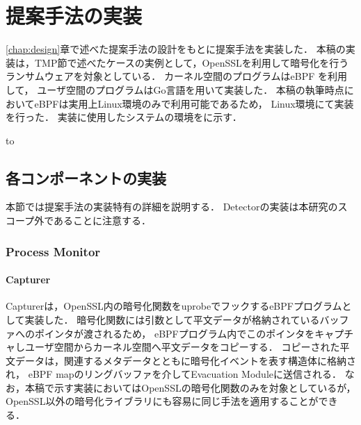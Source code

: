 \chapter{提案手法の実装}
\ref{chap:design}章で述べた提案手法の設計をもとに提案手法を実装した．
本稿の実装は，TMP節で述べたケースの実例として，OpenSSLを利用して暗号化を行うランサムウェアを対象としている．
カーネル空間のプログラムはeBPF \cite{WhatiseB81:online} を利用して，
ユーザ空間のプログラムはGo言語を用いて実装した．
本稿の執筆時点においてeBPFは実用上Linux環境のみで利用可能であるため，
Linux環境にて実装を行った．
実装に使用したシステムの環境をに示す．
\begin{table}[tb]
  \caption{Implementation environment for 提案手法.}
  \label{tab:impl-env}
  \hbox to
\end{table}

\section{各コンポーネントの実装}
本節では提案手法の実装特有の詳細を説明する．
Detectorの実装は本研究のスコープ外であることに注意する．

\subsection{Process Monitor}
\subsubsection{Capturer}
Capturerは，OpenSSL内の暗号化関数をuprobeでフックするeBPFプログラムとして実装した．
暗号化関数には引数として平文データが格納されているバッファへのポインタが渡されるため，
eBPFプログラム内でこのポインタをキャプチャしユーザ空間からカーネル空間へ平文データをコピーする．
コピーされた平文データは，関連するメタデータとともに暗号化イベントを表す構造体に格納され，
eBPF mapのリングバッファを介してEvacuation Moduleに送信される．
なお，本稿で示す実装においてはOpenSSLの暗号化関数のみを対象としているが，
OpenSSL以外の暗号化ライブラリにも容易に同じ手法を適用することができる．

